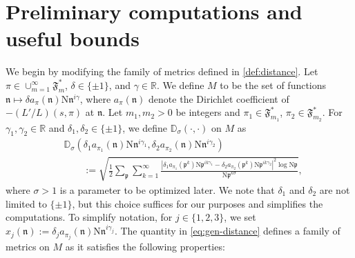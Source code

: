 \documentclass[12pt,reqno]{amsart}
\theoremstyle{remark}
\newcommand{\kn}{\mathfrak{n}}
\numberwithin{equation}{section}
\begin{document}
	
	\section{Preliminary computations and useful bounds}\label{sec:gen-strategy}
	
	

   We begin by modifying the family of metrics defined in \eqref{def:distance}. Let $\pi \in \cup_{m=1}^{\infty}\mathfrak{F}^*_m$, $\delta \in \{\pm1\}$, and $\gamma \in \mathbb{R}$. We define $M$ to be the set of functions $\kn \mapsto \delta a_{\pi}(\kn) \mathrm{N}\mathfrak{n}^{i\gamma}$, where $a_{\pi}(\mathfrak{n})$ denote the Dirichlet coefficient of $-(L'/L)(s, \pi)$ at $\kn$.
    Let $m_1, m_2 > 0$ be integers and $\pi_1 \in \mathfrak{F}_{m_1}^*$, $\pi_2 \in \mathfrak{F}_{m_2}^*$. For $\gamma_1, \gamma_2 \in \mathbb{R}$ and $\delta_1, \delta_2 \in \{\pm 1\}$, we define $\mathbb{D}_{\sigma}(\cdot, \cdot)$ on $M$ as
\begin{equation} \label{eq:gen-distance}
\begin{aligned}
&\mathbb{D}_{\sigma}(\delta_1 a_{\pi_1}(\mathfrak{n}) \mathrm{N}\mathfrak{n}^{i\gamma_1}, \delta_2 a_{\pi_2}(\mathfrak{n}) \mathrm{N}\mathfrak{n}^{i\gamma_2})\\ 
&\qquad := \sqrt{\frac{1}{2} \sum_{\mathfrak{p}} \sum_{k=1}^{\infty} \frac{|\delta_1 a_{\pi_1}(\mathfrak{p}^k)\mathrm{N}\mathfrak{p}^{ik\gamma_1} - \delta_2 a_{\pi_2}(\mathfrak{p}^k)\mathrm{N}\mathfrak{p}^{ik\gamma_2}|^2 \log \mathrm{N}\mathfrak{p}}{\mathrm{N}\mathfrak{p}^{k\sigma}} },
\end{aligned}
\end{equation}
where $\sigma > 1$ is a parameter to be optimized later. We note that $\delta_1$ and $\delta_2$ are not limited to $\{\pm1\}$, but this choice suffices for our purposes and simplifies the computations.
To simplify notation, for $j \in \{1, 2, 3\}$, we set $x_j(\mathfrak{n}) := \delta_j a_{\pi_j}(\mathfrak{n}) \mathrm{N}\mathfrak{n}^{i\gamma_j}$. The quantity in \eqref{eq:gen-distance} defines a family of metrics on $M$  as it satisfies the following properties:
\end{document}
